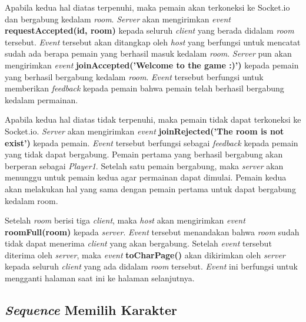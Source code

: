 Apabila kedua hal diatas terpenuhi, maka pemain akan terkoneksi ke Socket.io dan bergabung kedalam \textit{room}. \textit{Server} akan mengirimkan \textit{event} \textbf{requestAccepted(id, room)} kepada seluruh \textit{client} yang berada didalam \textit{room} tersebut. \textit{Event} tersebut akan ditangkap oleh \textit{host} yang berfungsi untuk mencatat sudah ada berapa pemain yang berhasil masuk kedalam \textit{room}. \textit{Server} pun akan mengirimkan \textit{event} \textbf{joinAccepted('Welcome to the game :)')} kepada pemain yang berhasil bergabung kedalam \textit{room}. \textit{Event} tersebut berfungsi untuk memberikan \textit{feedback} kepada pemain bahwa pemain telah berhasil bergabung kedalam permainan.

Apabila kedua hal diatas tidak terpenuhi, maka pemain tidak dapat terkoneksi ke Socket.io. \textit{Server} akan mengirimkan \textit{event} \textbf{joinRejected('The room is not exist')} kepada pemain. \textit{Event} tersebut berfungsi sebagai \textit{feedback} kepada pemain yang tidak dapat bergabung. Pemain pertama yang berhasil bergabung akan berperan sebagai \textit{Player1}. Setelah satu pemain bergabung, maka \textit{server} akan menunggu untuk pemain kedua agar permainan dapat dimulai. Pemain kedua akan melakukan hal yang sama dengan pemain pertama untuk dapat bergabung kedalam room.

Setelah \textit{room} berisi tiga \textit{client}, maka \textit{host} akan mengirimkan \textit{event} \textbf{roomFull(room)} kepada \textit{server}. \textit{Event} tersebut menandakan bahwa \textit{room} sudah tidak dapat menerima \textit{client} yang akan bergabung. Setelah \textit{event} tersebut diterima oleh \textit{server}, maka \textit{event} \textbf{toCharPage()} akan dikirimkan oleh \textit{server} kepada seluruh \textit{client} yang ada didalam \textit{room} tersebut. \textit{Event} ini berfungsi untuk mengganti halaman saat ini ke halaman selanjutnya.

\subsection{\textit{Sequence} Memilih Karakter}

